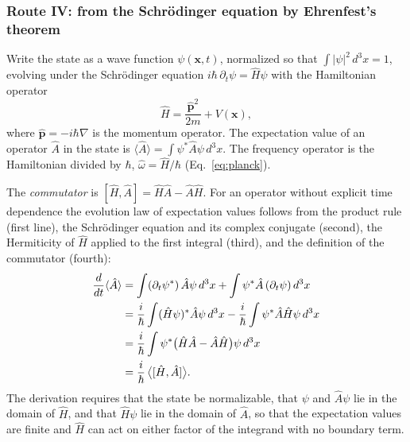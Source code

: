 \documentclass[aps,prd,onecolumn,tightenlines,nofootinbib,notitlepage,11pt,floatfix]{revtex4-2}
\theoremstyle{indentedtheorem}
\begin{document}
\subsubsection{Route IV: from the Schr\"odinger equation by Ehrenfest's theorem}
\label{sec:route_schrodinger}

Write the state as a wave function $\psi(\mathbf{x},t)$, normalized so that $\int|\psi|^2\,d^3x=1$, evolving under the Schr\"odinger equation $i\hbar\,\partial_t\psi=\hat{H}\psi$ \citep{Schrodinger1926Quantization4} with the Hamiltonian operator
\begin{equation}
    \hat{H}=\frac{\hat{\mathbf{p}}^2}{2m}+V(\mathbf{x}) ,
    \label{eq:schrodinger_hamiltonian}
\end{equation}
where $\hat{\mathbf{p}}=-i\hbar\nabla$ is the momentum operator. The expectation value of an operator $\hat{A}$ in the state is $\langle\hat{A}\rangle=\int\psi^*\hat{A}\psi\,d^3x$. The frequency operator is the Hamiltonian divided by $\hbar$, $\hat{\omega}=\hat{H}/\hbar$ (Eq.~\eqref{eq:planck}).

The \emph{commutator} is $[\hat{H},\hat{A}]=\hat{H}\hat{A}-\hat{A}\hat{H}$. For an operator without explicit time dependence the evolution law of expectation values \citep{Ehrenfest1927Bemerkung,Sakurai2020Modern} follows from the product rule (first line), the Schr\"odinger equation and its complex conjugate (second), the Hermiticity of $\hat{H}$ applied to the first integral (third), and the definition of the commutator (fourth):
\begin{align}
    \frac{d}{dt}\langle\hat{A}\rangle &= \int(\partial_t\psi^*)\,\hat{A}\psi\,d^3x + \int\psi^*\hat{A}\,(\partial_t\psi)\,d^3x \notag\\
    &= \frac{i}{\hbar}\int(\hat{H}\psi)^*\hat{A}\psi\,d^3x - \frac{i}{\hbar}\int\psi^*\hat{A}\hat{H}\psi\,d^3x \notag\\
    &= \frac{i}{\hbar}\int\psi^*\big(\hat{H}\hat{A}-\hat{A}\hat{H}\big)\psi\,d^3x \notag\\
    &= \frac{i}{\hbar} \, \big\langle[\hat{H},\hat{A}]\big\rangle .
    \label{eq:ehrenfest_commutator}
\end{align}
The derivation requires that the state be normalizable, that $\psi$ and $\hat{A}\psi$ lie in the domain of $\hat{H}$, and that $\hat{H}\psi$ lie in the domain of $\hat{A}$, so that the expectation values are finite and $\hat{H}$ can act on either factor of the integrand with no boundary term.
\end{document}

